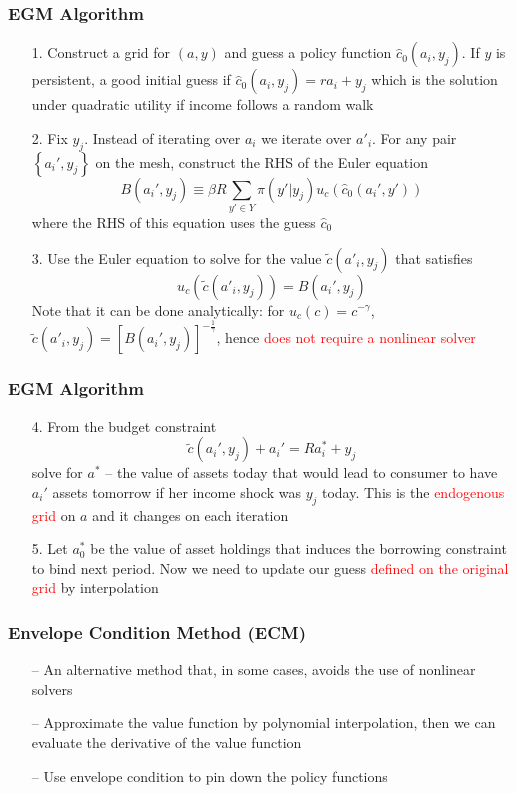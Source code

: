 \documentclass[aspectratio=169, 11pt]{beamer}
\begin{document}
\begin{frame}
\frametitle{EGM Algorithm}
  \begin{itemize}
    \item[1.] Construct a grid for $(a,y)$ and guess a policy function $\hat{c}_{0}(a_{i},y_{j})$. If $y$ is persistent, a good initial guess if $\hat{c}_{0}(a_{i},y_{j})=ra_{i}+y_{j}$ which is the solution under quadratic utility if income follows a random walk
    \medskip
    \item[2.] Fix $y_{j}$. Instead of iterating over $a_{i}$ we iterate over $a'_{i}$. For any pair $\left\{ a_{i}',y_{j}\right\}$ on the mesh, construct the RHS of the Euler equation
    \[
      B\left(a_{i}',y_{j}\right)\equiv\beta R\sum_{y'\in Y}\pi\left(y'|y_{j}\right)u_{c}\left(\hat{c}_{0}\left(a_{i}',y'\right)\right)
    \]
    where the RHS of this equation uses the guess $\hat{c}_{0}$
    \medskip
    \item[3.] Use the Euler equation to solve for the value $\tilde{c}\left(a'_{i},y_{j}\right)$ that satisfies
    \[
      u_{c}\left(\tilde{c}\left(a'_{i},y_{j}\right)\right)=B\left(a_{i}',y_{j}\right)
    \]
    Note that it can be done analytically: for $u_c(c)=c^{-\gamma}$, $\tilde{c}\left(a'_{i},y_{j}\right)=\left[B\left(a_{i}',y_{j}\right)\right]^{-\frac{1}{\gamma}}$, hence \textcolor{red}{does not require a nonlinear solver}
  \end{itemize}
\end{frame}

\begin{frame}
\frametitle{EGM Algorithm}
  \begin{itemize}
    \item[4.] From the budget constraint
    \[
      \tilde{c}\left(a_{i}',y_{j}\right)+a_{i}'=Ra_{i}^{*}+y_{j}
    \]
    solve for $a^{*}$ -- the value of assets today that would lead to consumer to have $a_{i}'$ assets tomorrow if her income shock was $y_{j}$ today. This is the \textcolor{red}{endogenous grid} on $a$ and it changes on each iteration
    \bigskip
    \item[5.] Let $a_{0}^{*}$ be the value of asset holdings that induces the borrowing constraint to bind next period. Now we need to update our guess \textcolor{red}{defined on the original grid} by interpolation
  \end{itemize}
\end{frame}

\begin{frame}
\frametitle{Envelope Condition Method (ECM)}
  \begin{itemize}
    \item[--] An alternative method that, in some cases, avoids the use of nonlinear solvers
    \bigskip
    \item[--] Approximate the value function by polynomial interpolation, then we can evaluate the derivative of the value function
    \bigskip
    \item[--] Use envelope condition to pin down the policy functions
  \end{itemize}
\end{frame}
\end{document}

